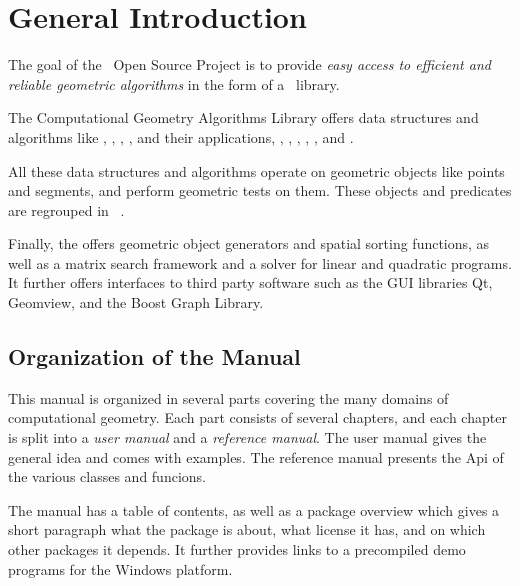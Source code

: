 
\chapter{General Introduction}



The goal of the \cgal\ Open Source Project is to provide 
{\em easy access to efficient and reliable geometric algorithms}
in the form of a \CC\ library.

The Computational Geometry Algorithms Library offers data
structures and algorithms like 
,
,
,
,
 and their applications,
,
,
,
,
,
and .


All these data structures and algorithms operate on geometric objects
like points and segments, and perform geometric tests on them.
These objects and predicates are regrouped in \cgal\ .


Finally, the 
offers geometric object generators and spatial sorting functions,  
as well as a matrix search framework and a solver for linear and quadratic programs. 
It further offers interfaces to third party software such as the GUI libraries Qt, 
Geomview, and the Boost Graph Library.


\section{Organization of the Manual}

This manual is organized in several parts covering the many domains
of computational geometry. Each part consists of several chapters,
and each chapter is split into a {\em user manual}  and a {\em reference
manual}. The user manual gives the general idea and comes with examples.
The reference manual presents the {\sc Api} of the various classes
and funcions.

The manual has a table of contents, as well as a package overview
which gives a short paragraph what the package is about, what license
it has, and on which other packages it depends. It further provides
links to a precompiled demo programs for the Windows platform.

